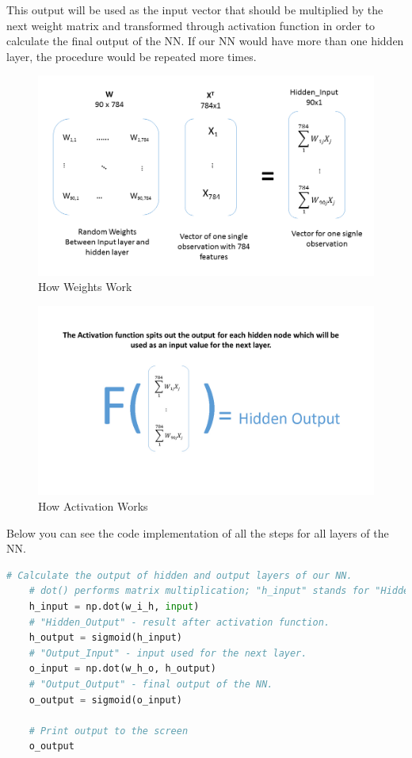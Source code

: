 This output will be used as the input vector that should be multiplied by the next weight matrix and transformed through activation function in order to calculate the final output of the NN. If our NN would have more than one hidden layer, the procedure would be repeated more times.

\begin{figure}[H]
    \includegraphics[width=\linewidth]{pics/multiplication.png}
    \caption{\label{fig:multiplication} How Weights Work}
\end{figure}

\begin{figure}[H]
    \includegraphics[width=\linewidth]{pics/activation.jpg}
    \caption{\label{fig:activation} How Activation Works}
\end{figure}

Below you can see the code implementation of all the steps for all layers of the NN.

\begin{lstlisting}[language=Python]
    # Calculate the output of hidden and output layers of our NN.
    # dot() performs matrix multiplication; "h_input" stands for "Hidden_Input".
    h_input = np.dot(w_i_h, input) 
    # "Hidden_Output" - result after activation function.
    h_output = sigmoid(h_input) 
    # "Output_Input" - input used for the next layer.
    o_input = np.dot(w_h_o, h_output)
    # "Output_Output" - final output of the NN.
    o_output = sigmoid(o_input)

    # Print output to the screen
    o_output 
\end{lstlisting}

